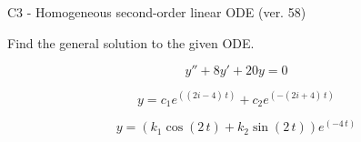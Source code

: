 \begin{exercise}
  \begin{exerciseTitle}C3 - Homogeneous second-order linear ODE (ver. 58)\end{exerciseTitle}
  \begin{exerciseStatement}
    
Find the general solution to the given ODE.

    
\[y''+8y'+20y = 0\]

  \end{exerciseStatement}
  \begin{exerciseAnswer}
    
\[y= c_{1} e^{\left(\left(2 i - 4\right) \, t\right)} + c_{2} e^{\left(-\left(2 i + 4\right) \, t\right)}\]

    
\[y= {\left(k_{1} \cos\left(2 \, t\right) + k_{2} \sin\left(2 \, t\right)\right)} e^{\left(-4 \, t\right)}\]

  \end{exerciseAnswer}
\end{exercise}